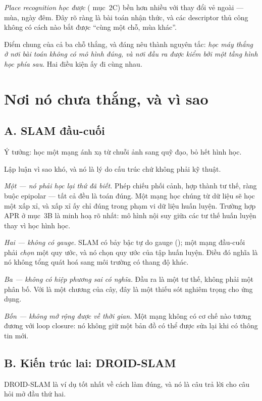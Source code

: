 \documentclass[../../vslam.tex]{subfiles}
\begin{document}
\emph{Place recognition học được} ( mục~2C) bền hơn nhiều với thay đổi vẻ ngoài --- mùa, ngày đêm. Đây rõ ràng là bài toán nhận thức, và các descriptor thủ công không có cách nào bắt được ``cùng một chỗ, mùa khác''.

Điểm chung của cả ba chỗ thắng, và đáng nêu thành nguyên tắc: \emph{học máy thắng ở nơi bài toán không có mô hình đúng, và nơi đầu ra được kiểm bởi một tầng hình học phía sau}. Hai điều kiện ấy đi cùng nhau.

\section{Nơi nó chưa thắng, và vì sao}

\subsection{A. SLAM đầu-cuối}

Ý tưởng: học một mạng ánh xạ từ chuỗi ảnh sang quỹ đạo, bỏ hết hình học.

Lập luận vì sao khó, và nó là lý do cấu trúc chứ không phải kỹ thuật.

\emph{Một --- nó phải học lại thứ đã biết.} Phép chiếu phối cảnh, hợp thành tư thế, ràng buộc epipolar --- tất cả đều là toán đúng. Một mạng học chúng từ dữ liệu sẽ học một xấp xỉ, và xấp xỉ ấy chỉ đúng trong phạm vi dữ liệu huấn luyện. Trường hợp APR ở  mục~3B là minh hoạ rõ nhất: mô hình nội suy giữa các tư thế huấn luyện thay vì học hình học.

\emph{Hai --- không có gauge.} SLAM có bảy bậc tự do gauge (); một mạng đầu-cuối phải \emph{chọn} một quy ước, và nó chọn quy ước của tập huấn luyện. Điều đó nghĩa là nó không tổng quát hoá sang môi trường có thang độ khác.

\emph{Ba --- không có hiệp phương sai có nghĩa.} Đầu ra là một tư thế, không phải một phân bố. Với  là một chương của cây, đây là một thiếu sót nghiêm trọng cho ứng dụng.

\emph{Bốn --- không mở rộng được về thời gian.} Một mạng không có cơ chế nào tương đương với loop closure: nó không giữ một bản đồ có thể được sửa lại khi có thông tin mới.

\subsection{B. Kiến trúc lai: DROID-SLAM}

DROID-SLAM \cite{teed2021droidslam} là ví dụ tốt nhất về cách làm đúng, và nó là câu trả lời cho câu hỏi mở đầu thứ hai.
\end{document}
